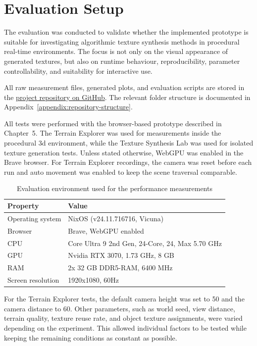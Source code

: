 \section{Evaluation Setup}

The evaluation was conducted to validate whether the implemented prototype is suitable for investigating algorithmic texture synthesis methods in procedural real-time environments. The focus is not only on the visual appearance of generated textures, but also on runtime behaviour, reproducibility, parameter controllability, and suitability for interactive use.

All raw measurement files, generated plots, and evaluation scripts are stored in the \href{https://github.com/omeldar/baa-algorithmic-texture-synthesis}{project repository on GitHub}. The relevant folder structure is documented in Appendix~\ref{appendix:repository-structure}.

All tests were performed with the browser-based prototype described in Chapter~5. The Terrain Explorer was used for measurements inside the procedural \gls{3d} environment, while the Texture Synthesis Lab was used for isolated texture generation tests. Unless stated otherwise, WebGPU was enabled in the Brave browser. For Terrain Explorer recordings, the camera was reset before each run and auto movement was enabled to keep the scene traversal comparable.

\begin{table}[H]
\centering
\caption{Evaluation environment used for the performance measurements}
\label{tab:evaluation-environment}
\begin{tabularx}{\textwidth}{|l|X|}
\hline
\textbf{Property} & \textbf{Value} \\
\hline
\hline
Operating system & NixOS (v24.11.716716, Vicuna) \\
\hline
Browser & Brave, WebGPU enabled \\
\hline
CPU & Core Ultra 9 2nd Gen, 24-Core, 24, Max 5.70 GHz \\
\hline
GPU & Nvidia RTX 3070, 1.73 GHz, 8 GB \\
\hline
RAM & 2x 32 GB DDR5-RAM, 6400 MHz \\
\hline
Screen resolution & 1920x1080, 60Hz \\
\hline
\end{tabularx}
\end{table}

For the Terrain Explorer tests, the default camera height was set to 50 and the camera distance to 60. Other parameters, such as world seed, view distance, terrain quality, texture reuse rate, and object texture assignments, were varied depending on the experiment. This allowed individual factors to be tested while keeping the remaining conditions as constant as possible.

